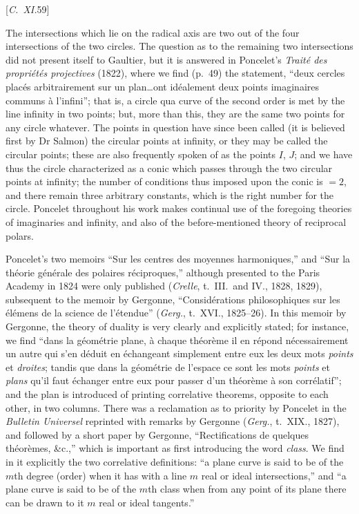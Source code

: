 \documentclass[12pt,a4paper,oneside]{book}
\newcommand{\paperref}[1]{\par\noindent\hfill[#1]\hfill\null\par}
\begin{document}
\paperref{\textit{C.~XI.}\hfill 59}
\newpage
The intersections which lie on the radical axis are two out of the four intersections of the two circles. The question as to the remaining two intersections did not present itself to Gaultier, but it is answered in Poncelet's \textit{Trait\'e des propri\'et\'es projectives} (1822), where we find (p.~49) the statement, ``deux cercles plac\'es arbitrairement sur un plan\dots ont id\'ealement deux points imaginaires communs \`a l'infini''; that is, a circle qua curve of the second order is met by the line infinity in two points; but, more than this, they are the same two points for any circle whatever. The points in question have since been called (it is believed first by Dr Salmon) the circular points at infinity, or they may be called the circular points; these are also frequently spoken of as the points $I$, $J$; and we have thus the circle characterized as a conic which passes through the two circular points at infinity; the number of conditions thus imposed upon the conic is $=2$, and there remain three arbitrary constants, which is the right number for the circle. Poncelet throughout his work makes continual use of the foregoing theories of imaginaries and infinity, and also of the before-mentioned theory of reciprocal polars.

Poncelet's two memoirs ``Sur les centres des moyennes harmoniques,'' and ``Sur la th\'eorie g\'en\'erale des polaires r\'eciproques,'' although presented to the Paris Academy in 1824 were only published (\textit{Crelle}, t.~III.\ and IV., 1828, 1829), subsequent to the memoir by Gergonne, ``Consid\'erations philosophiques sur les \'el\'emens de la science de l'\'etendue'' (\textit{Gerg.}, t.~XVI., 1825--26). In this memoir by Gergonne, the theory of duality is very clearly and explicitly stated; for instance, we find ``dans la g\'eom\'etrie plane, \`a chaque th\'eor\`eme il en r\'epond n\'ecessairement un autre qui s'en d\'eduit en \'echangeant simplement entre eux les deux mots \textit{points} et \textit{droites}; tandis que dans la g\'eom\'etrie de l'espace ce sont les mots \textit{points} et \textit{plans} qu'il faut \'echanger entre eux pour passer d'un th\'eor\`eme \`a son corr\'elatif''; and the plan is introduced of printing correlative theorems, opposite to each other, in two columns. There was a reclamation as to priority by Poncelet in the \textit{Bulletin Universel} reprinted with remarks by Gergonne (\textit{Gerg.}, t.~XIX., 1827), and followed by a short paper by Gergonne, ``Rectifications de quelques th\'eor\`emes, \&c.,'' which is important as first introducing the word \textit{class}. We find in it explicitly the two correlative definitions: ``a plane curve is said to be of the $m$th degree (order) when it has with a line $m$ real or ideal intersections,'' and ``a plane curve is said to be of the $m$th class when from any point of its plane there can be drawn to it $m$ real or ideal tangents.''
\end{document}
